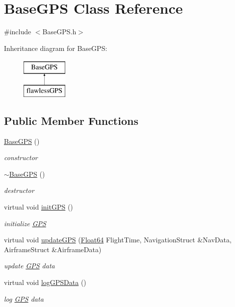 \hypertarget{class_base_g_p_s}{}\section{Base\+G\+PS Class Reference}
\label{class_base_g_p_s}


{\ttfamily \#include $<$Base\+G\+P\+S.\+h$>$}

Inheritance diagram for Base\+G\+PS\+:\begin{figure}[H]
\begin{center}
\leavevmode
\includegraphics[height=2.000000cm]{class_base_g_p_s}
\end{center}
\end{figure}
\subsection*{Public Member Functions}
\begin{DoxyCompactItemize}
\item 
\hyperlink{class_base_g_p_s_a224584d4b12f0663d9fb2caf996d05bb}{Base\+G\+PS} ()
\begin{DoxyCompactList}\small\item\em constructor \end{DoxyCompactList}\item 
\hyperlink{class_base_g_p_s_aa80ae9016c4e52d7654435b122106434}{$\sim$\+Base\+G\+PS} ()
\begin{DoxyCompactList}\small\item\em destructor \end{DoxyCompactList}\item 
virtual void \hyperlink{class_base_g_p_s_a68dbbdd67e5d9de606810377f1cec0e3}{init\+G\+PS} ()
\begin{DoxyCompactList}\small\item\em initialize \hyperlink{class_g_p_s}{G\+PS} \end{DoxyCompactList}\item 
virtual void \hyperlink{class_base_g_p_s_ac8bb7ab0f8b35a5e6a29fed125268ce6}{update\+G\+PS} (\hyperlink{group___tools_ga3f1431cb9f76da10f59246d1d743dc2c}{Float64} Flight\+Time, Navigation\+Struct \&Nav\+Data, Airframe\+Struct \&Airframe\+Data)
\begin{DoxyCompactList}\small\item\em update \hyperlink{class_g_p_s}{G\+PS} data \end{DoxyCompactList}\item 
virtual void \hyperlink{class_base_g_p_s_ad62094ad9ac6e9813cd65e63aeb7df13}{log\+G\+P\+S\+Data} ()
\begin{DoxyCompactList}\small\item\em log \hyperlink{class_g_p_s}{G\+PS} data \end{DoxyCompactList}\end{DoxyCompactItemize}


